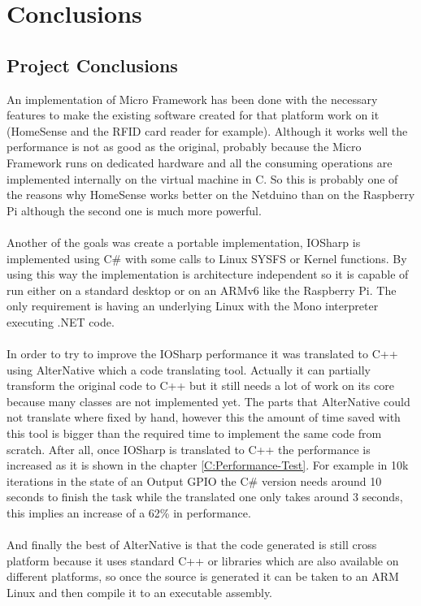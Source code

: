 \chapter{Conclusions}\label{C:Conclusions}
\section{Project Conclusions}\label{S:Project-Conclusions}
An implementation of Micro Framework has been done with the necessary features to make the existing software created for that platform work on it (HomeSense and the RFID card reader for example). Although it works well the performance is not as good as the original, probably because the Micro Framework runs on dedicated hardware and all the consuming operations are implemented internally on the virtual machine in C. So this is probably one of the reasons why HomeSense works better on the Netduino than on the Raspberry Pi although the second one is much more powerful.
\\
\\
Another of the goals was create a portable implementation, IOSharp is implemented using C\# with some calls to Linux SYSFS or Kernel functions. By using this way the implementation is architecture independent so it is capable of run either on a standard desktop or on an ARMv6 like the Raspberry Pi. The only requirement is having an underlying Linux with the Mono interpreter executing .NET code.
\\
\\
In order to try to improve the IOSharp performance it was translated to C++ using AlterNative which a code translating tool. Actually it can partially transform the original code to C++ but it still needs a lot of work on its core because many classes are not implemented yet. The parts that AlterNative could not translate where fixed by hand, however this the amount of time saved with this tool is bigger than the required time to implement the same code from scratch. After all, once IOSharp is translated to C++ the performance is increased as it is shown in the chapter \ref{C:Performance-Test}. For example in 10k iterations in the state of an Output GPIO the C\# version needs around 10 seconds to finish the task while the translated one only takes around 3 seconds, this implies an increase of a 62\% in performance.
\\
\\
And finally the best of AlterNative is that the code generated is still cross platform because it uses standard C++ or libraries which are also available on different platforms, so once the source is generated it can be taken to an ARM Linux and then compile it to an executable assembly.

